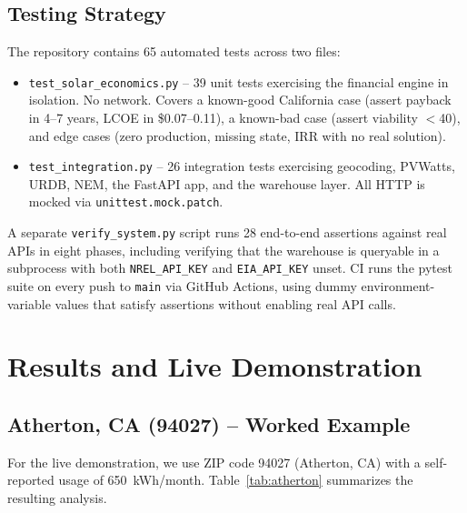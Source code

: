 \documentclass[10pt, conference]{IEEEtran}
\begin{document}
\subsection{Testing Strategy}

The repository contains 65 automated tests across two files:

\begin{itemize}
\item \texttt{test\_solar\_economics.py} -- 39 unit tests exercising the financial engine in isolation. No network. Covers a known-good California case (assert payback in 4--7 years, LCOE in \$0.07--0.11), a known-bad case (assert viability $<$40), and edge cases (zero production, missing state, IRR with no real solution).
\item \texttt{test\_integration.py} -- 26 integration tests exercising geocoding, PVWatts, URDB, NEM, the FastAPI app, and the warehouse layer. All HTTP is mocked via \texttt{unittest.mock.patch}.
\end{itemize}

A separate \texttt{verify\_system.py} script runs 28 end-to-end assertions against real APIs in eight phases, including verifying that the warehouse is queryable in a subprocess with both \texttt{NREL\_API\_KEY} and \texttt{EIA\_API\_KEY} unset. CI runs the pytest suite on every push to \texttt{main} via GitHub Actions, using dummy environment-variable values that satisfy assertions without enabling real API calls.

\section{Results and Live Demonstration}

\subsection{Atherton, CA (94027) -- Worked Example}

For the live demonstration, we use ZIP code 94027 (Atherton, CA) with a self-reported usage of 650~kWh/month. Table~\ref{tab:atherton} summarizes the resulting analysis.
\end{document}
